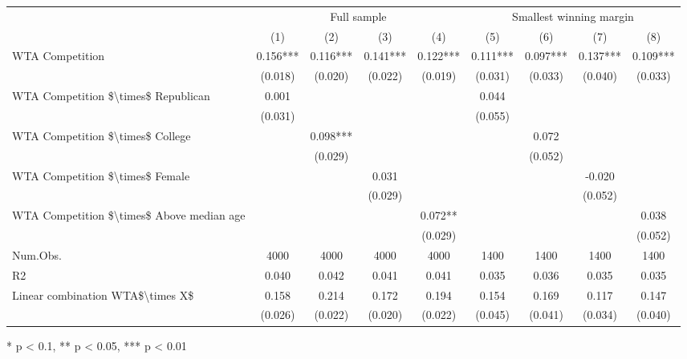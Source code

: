 \begin{table}[t]
\fontsize{12.0pt}{14.4pt}\selectfont
\begin{tabular*}{\linewidth}{@{\extracolsep{\fill}}lcccccccc}
\toprule
 & \multicolumn{4}{c}{Full sample} & \multicolumn{4}{c}{Smallest winning margin} \\ 
\cmidrule(lr){2-5} \cmidrule(lr){6-9}
  & (1) & (2) & (3) & (4) & (5) & (6) & (7) & (8) \\ 
\midrule\addlinespace[2.5pt]
WTA Competition & 0.156*** & 0.116*** & 0.141*** & 0.122*** & 0.111*** & 0.097*** & 0.137*** & 0.109*** \\ 
 & (0.018) & (0.020) & (0.022) & (0.019) & (0.031) & (0.033) & (0.040) & (0.033) \\ 
WTA Competition \$\textbackslash{}times\$ Republican & 0.001 &  &  &  & 0.044 &  &  &  \\ 
 & (0.031) &  &  &  & (0.055) &  &  &  \\ 
WTA Competition \$\textbackslash{}times\$ College &  & 0.098*** &  &  &  & 0.072 &  &  \\ 
 &  & (0.029) &  &  &  & (0.052) &  &  \\ 
WTA Competition \$\textbackslash{}times\$ Female &  &  & 0.031 &  &  &  & -0.020 &  \\ 
 &  &  & (0.029) &  &  &  & (0.052) &  \\ 
WTA Competition \$\textbackslash{}times\$ Above median age &  &  &  & 0.072** &  &  &  & 0.038 \\ 
{} & {} & {} & {} & {(0.029)} & {} & {} & {} & {(0.052)} \\ 
Num.Obs. & 4000 & 4000 & 4000 & 4000 & 1400 & 1400 & 1400 & 1400 \\ 
R2 & 0.040 & 0.042 & 0.041 & 0.041 & 0.035 & 0.036 & 0.035 & 0.035 \\ 
Linear combination WTA\$\textbackslash{}times X\$ & 0.158 & 0.214 & 0.172 & 0.194 & 0.154 & 0.169 & 0.117 & 0.147 \\ 
 & (0.026) & (0.022) & (0.020) & (0.022) & (0.045) & (0.041) & (0.034) & (0.040) \\ 
\bottomrule
\end{tabular*}
\begin{minipage}{\linewidth}
* p < 0.1, ** p < 0.05, *** p < 0.01\\
\end{minipage}
\end{table}

